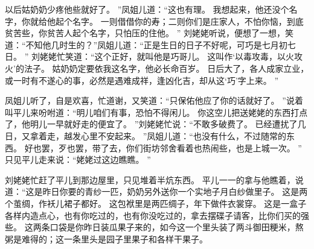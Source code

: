 以后姑奶奶少疼他些就好了。
”凤姐儿道：“这也有理。
我想起来，他还没个名字，你就给他起个名字。
一则借借你的寿；二则你们是庄家人，不怕你恼，到底贫苦些，你贫苦人起个名字，只怕压的住他。
”
刘姥姥听说，便想了一想，笑道：“不知他几时生的？”凤姐儿道：“正是生日的日子不好呢，可巧是七月初七日。
”
刘姥姥忙笑道：“这个正好，就叫他是巧哥儿。
这叫作‘以毒攻毒，以火攻火’的法子。
姑奶奶定要依我这名字，他必长命百岁。
日后大了，各人成家立业，或一时有不遂心的事，必然是遇难成祥，逢凶化吉，却从这‘巧’字上来。
”\par
凤姐儿听了，自是欢喜，忙道谢，又笑道：“只保佑他应了你的话就好了。
”说着叫平儿来吩咐道：“明儿咱们有事，恐怕不得闲儿。
你这空儿把送姥姥的东西打点了，他明儿一早就好走的便宜了。
”刘姥姥忙说：“不敢多破费了。
已经遭扰了几日，又拿着走，越发心里不安起来。
”凤姐儿道：“也没有什么，不过随常的东西。
好也罢，歹也罢，带了去，你们街坊邻舍看着也热闹些，也是上城一次。
”
只见平儿走来说：“姥姥过这边瞧瞧。
”\par
刘姥姥忙赶了平儿到那边屋里，只见堆着半炕东西。
平儿一一的拿与他瞧着，说道：“这是昨日你要的青纱一匹，奶奶另外送你一个实地子月白纱做里子。
这是两个茧绸，作袄儿裙子都好。
这包袱里是两匹绸子，年下做件衣裳穿。
这是一盒子各样内造点心，也有你吃过的，也有你没吃过的，拿去摆碟子请客，比你们买的强些。
这两条口袋是你昨日装瓜果子来的，如今这一个里头装了两斗御田粳米，熬粥是难得的；这一条里头是园子里果子和各样干果子。
